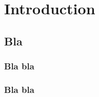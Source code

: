 
    
    \chapter{Introduction}
        
        \minitoc
        \vfill
        \pagebreak
        
        \section{Bla}
        
            \subsection{Bla bla}
                
                \lipsum
                
            
            \subsection{Bla bla}
                
                \lipsum
            
            
        
    
